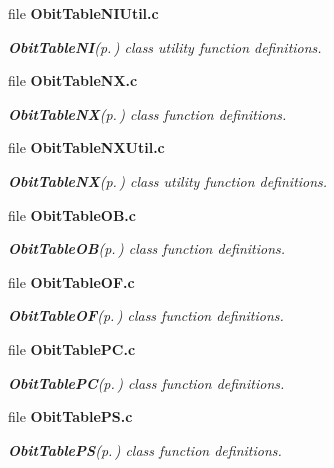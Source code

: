 \begin{CompactItemize}
\item 
file {\bf Obit\-Table\-NIUtil.c}
\begin{CompactList}\small\item\em {\bf Obit\-Table\-NI}{\rm (p.\,\pageref{structObitTableNI})} class utility function definitions. \item\end{CompactList}

\item 
file {\bf Obit\-Table\-NX.c}
\begin{CompactList}\small\item\em {\bf Obit\-Table\-NX}{\rm (p.\,\pageref{structObitTableNX})} class function definitions. \item\end{CompactList}

\item 
file {\bf Obit\-Table\-NXUtil.c}
\begin{CompactList}\small\item\em {\bf Obit\-Table\-NX}{\rm (p.\,\pageref{structObitTableNX})} class utility function definitions. \item\end{CompactList}

\item 
file {\bf Obit\-Table\-OB.c}
\begin{CompactList}\small\item\em {\bf Obit\-Table\-OB}{\rm (p.\,\pageref{structObitTableOB})} class function definitions. \item\end{CompactList}

\item 
file {\bf Obit\-Table\-OF.c}
\begin{CompactList}\small\item\em {\bf Obit\-Table\-OF}{\rm (p.\,\pageref{structObitTableOF})} class function definitions. \item\end{CompactList}

\item 
file {\bf Obit\-Table\-PC.c}
\begin{CompactList}\small\item\em {\bf Obit\-Table\-PC}{\rm (p.\,\pageref{structObitTablePC})} class function definitions. \item\end{CompactList}

\item 
file {\bf Obit\-Table\-PS.c}
\begin{CompactList}\small\item\em {\bf Obit\-Table\-PS}{\rm (p.\,\pageref{structObitTablePS})} class function definitions. \item\end{CompactList}


\end{CompactItemize}
